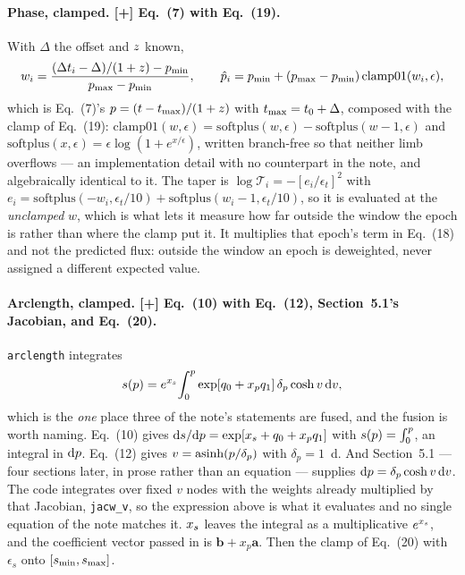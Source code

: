 \documentclass[11pt]{article}
\newcommand{\code}[1]{\texttt{#1}}
\begin{document}
\paragraph{Phase, clamped. [+] Eq.~(7) with Eq.~(19).} With $\Delta$ the offset and
$z$ known,
\begin{equation}
  w_{i} = \frac{(\Delta t_{i} - \Delta)/(1 + z) - p_{\min}}
               {p_{\max} - p_{\min}} , \qquad
  \hat{p}_{i} = p_{\min} + (p_{\max} - p_{\min})\,
    \mathrm{clamp01}(w_{i}, \epsilon) ,
\end{equation}
which is Eq.~(7)'s $p = (t - t_{\mathrm{max}})/(1 + z)$ with $t_{\mathrm{max}} = t_{0} + \Delta$,
composed with the clamp of Eq.~(19): $\mathrm{clamp01}(w, \epsilon) =
\mathrm{softplus}(w, \epsilon) - \mathrm{softplus}(w - 1, \epsilon)$ and
$\mathrm{softplus}(x, \epsilon) = \epsilon\log(1 + e^{x/\epsilon})$, written branch-free so
that neither limb overflows --- an implementation detail with no counterpart in the note,
and algebraically identical to it. The taper is
$\log\mathcal{T}_{i} = -[e_{i}/\epsilon_{t}]^{2}$ with
$e_{i} = \mathrm{softplus}(-w_{i}, \epsilon_{t}/10) +
\mathrm{softplus}(w_{i} - 1, \epsilon_{t}/10)$, so it is evaluated at the \emph{unclamped}
$w$, which is what lets it measure how far outside the window the epoch is rather than
where the clamp put it. It multiplies that epoch's term in Eq.~(18) and not the predicted
flux: outside the window an epoch is deweighted, never assigned a different expected
value.

\paragraph{Arclength, clamped. [+] Eq.~(10) with Eq.~(12), Section~5.1's Jacobian, and
Eq.~(20).} \code{arclength} integrates
\begin{equation}
  s(p) = e^{x_{s}}\!\int_{0}^{p}
    \exp[q_{0} + x_p q_{1}]\,\delta_{p}\cosh v\,\mathrm{d} v ,
\end{equation}
which is the \emph{one} place three of the note's statements are fused, and the fusion is
worth naming. Eq.~(10) gives $\mathrm{d}s/\mathrm{d}p = \exp[x_{s} + q_{0} + x_p q_{1}]$ with
$s(p) = \int_{0}^{p}$, an integral in $\mathrm{d}p$. Eq.~(12) gives
$v = \operatorname{asinh}(p/\delta_{p})$ with $\delta_{p} = 1$~d. And Section~5.1 --- four sections
later, in prose rather than an equation --- supplies $\mathrm{d}p = \delta_{p}\cosh v\,\mathrm{d} v$.
The code integrates over fixed $v$ nodes with the weights already multiplied by that
Jacobian, \code{jacw\_v}, so the expression above is what it evaluates and no single
equation of the note matches it. $x_{s}$ leaves the integral as a multiplicative
$e^{x_{s}}$, and the coefficient vector passed in is
$\mathbf{b} + x_p\mathbf{a}$. Then the clamp of Eq.~(20) with $\epsilon_{s}$ onto
$[s_{\min}, s_{\max}]$.
\end{document}
